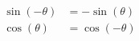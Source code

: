 \documentclass[preview]{standalone}
\begin{document}
\begin{align*}
\sin({-\theta})&=-\sin({\theta}) \\ \cos({\theta})&=\cos({-\theta})
\end{align*}
\end{document}
